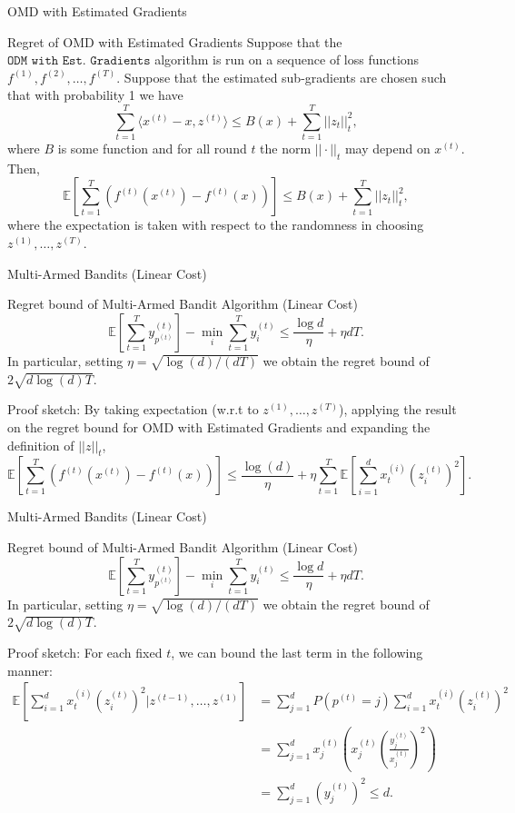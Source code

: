 \begin{frame}{OMD with Estimated Gradients}
    \small
    \begin{block}{Regret of OMD with Estimated Gradients}
        Suppose that the $\texttt{ODM with Est. Gradients}$ algorithm is run on a sequence of loss functions $f^{(1)}, f^{(2)}, \dots, f^{(T)}$. Suppose that the estimated sub-gradients are chosen such that with probability 1 we have
        $$ \sum_{t=1}^T \langle x^{(t)} - x, z^{(t)} \rangle \leq B(x) + \sum_{t=1}^{T} ||z_t||^2_t,$$
        where $B$ is some function and for all round $t$ the norm $||\cdot||_t$ may depend on $x^{(t)}$. Then,
        $$ \mathbb{E}\left[ \sum_{t=1}^{T} \left( f^{(t)}(x^{(t)}) - f^{(t)}(x) \right) \right] \leq B(x) + \sum_{t=1}^{T} ||z_t||^2_t, $$
        where the expectation is taken with respect to the randomness in choosing $z^{(1)}, \dots, z^{(T)}$.
    \end{block}
\end{frame}

\begin{frame}{Multi-Armed Bandits (Linear Cost)}
    \small
    \begin{block}{Regret bound of Multi-Armed Bandit Algorithm (Linear Cost)}
        $$
        \mathbb{E}\left[\sum_{t=1}^{T} y^{(t)}_{p^{(t)}}\right] - \min_i \sum_{t=1}^{T} y^{(t)}_i
        \leq \frac{\log d}{\eta} + \eta d T.
        $$
        In particular, setting $\eta = \sqrt{\log(d)/(dT)}$ we obtain the regret bound of
        $2\sqrt{d \log(d) T}$.
    \end{block}
    Proof sketch:
    By taking expectation (w.r.t to $z^{(1)}, \dots, z^{(T)}$), applying the result on the regret bound for OMD with Estimated Gradients and expanding the definition of $||z||_t$,
    $$
    \mathbb{E}\left[ \sum_{t=1}^{T} \left( f^{(t)}(x^{(t)}) - f^{(t)}(x) \right) \right] \leq \frac{\log(d)}{\eta} + \eta \sum_{t=1}^T \mathbb{E}\left[ \sum_{i=1}^d x^{(i)}_t (z^{(t)}_i)^2\right].
    $$
\end{frame}

\begin{frame}{Multi-Armed Bandits (Linear Cost)}
    \footnotesize
    \begin{block}{Regret bound of Multi-Armed Bandit Algorithm (Linear Cost)}
        $$
        \mathbb{E}\left[\sum_{t=1}^{T} y^{(t)}_{p^{(t)}}\right] - \min_i \sum_{t=1}^{T} y^{(t)}_i
        \leq \frac{\log d}{\eta} + \eta d T.
        $$
        In particular, setting $\eta = \sqrt{\log(d)/(dT)}$ we obtain the regret bound of
        $2\sqrt{d \log(d) T}$.
    \end{block}
    Proof sketch:
    For each fixed $t$, we can bound the last term in the following manner:
    \begin{align*}
        \mathbb{E}\left[ \sum_{i=1}^d x^{(i)}_t (z^{(t)}_i)^2 | z^{(t-1)}, \dots, z^{(1)}\right]
        &= \sum_{j=1}^d P(p^{(t)} = j) \sum_{i=1}^d x^{(i)}_t (z^{(t)}_i)^2 \\
        &= \sum_{j=1}^d x^{(t)}_j \left( x^{(t)}_j \left(\frac{y^{(t)}_j}{x^{(t)}_j}\right)^2 \right) \\
        &= \sum_{j=1}^d \left( y^{(t)}_j \right)^2 \leq d.
    \end{align*}
\end{frame}

